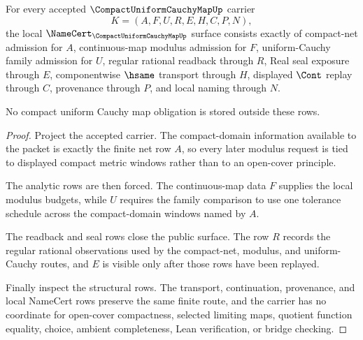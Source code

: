 \begin{theorem}
\label{thm:compact-uniform-cauchy-map-namecert-obligations}
For every accepted $\CompactUniformCauchyMapUp$ carrier
$$
K=(A,F,U,R,E,H,C,P,N),
$$
the local $\NameCert_{\CompactUniformCauchyMapUp}$ surface consists exactly of compact-net admission for $A$, continuous-map modulus admission for $F$, uniform-Cauchy family admission for $U$, regular rational readback through $R$, Real seal exposure through $E$, componentwise $\hsame$ transport through $H$, displayed $\Cont$ replay through $C$, provenance through $P$, and local naming through $N$.

No compact uniform Cauchy map obligation is stored outside these rows.
\end{theorem}
\begin{proof}
Project the accepted carrier. The compact-domain information available to the packet is exactly the finite net row $A$, so every later modulus request is tied to displayed compact metric windows rather than to an open-cover principle.

The analytic rows are then forced. The continuous-map data $F$ supplies the local modulus budgets, while $U$ requires the family comparison to use one tolerance schedule across the compact-domain windows named by $A$.

The readback and seal rows close the public surface. The row $R$ records the regular rational observations used by the compact-net, modulus, and uniform-Cauchy routes, and $E$ is visible only after those rows have been replayed.

Finally inspect the structural rows. The transport, continuation, provenance, and local NameCert rows preserve the same finite route, and the carrier has no coordinate for open-cover compactness, selected limiting maps, quotient function equality, choice, ambient completeness, Lean verification, or bridge checking.
\end{proof}

